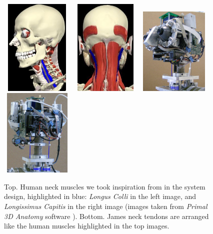 \documentclass[conference]{IEEEtran}
\numberwithin{equation}{section}
\begin{document}
\begin{figure}[tbp]
\centering
\includegraphics[width=35mm, height=46mm]{image/LongusColliC.jpg} 
\includegraphics[width=35mm, height=46mm]{image/LongissimusCapitisC2.jpg} 
\includegraphics[width=35mm, height=42mm]{image/frontHeadBB.jpg} 
\includegraphics[width=35mm, height=42mm]{image/backHeadBB.jpg} 
\caption{Top. Human neck muscles we took inspiration from in the system design, highlighted in blue: \emph{Longus Colli} in the left image, and \emph{Longissimus Capitis} in the right image (images taken from \emph{Primal 3D Anatomy} software \cite{Kendall05muscles}). Bottom. James neck tendons are arranged like the human muscles highlighted in the top images.}
\label{Fig:NeckMuscles}
\end{figure}
\end{document}
